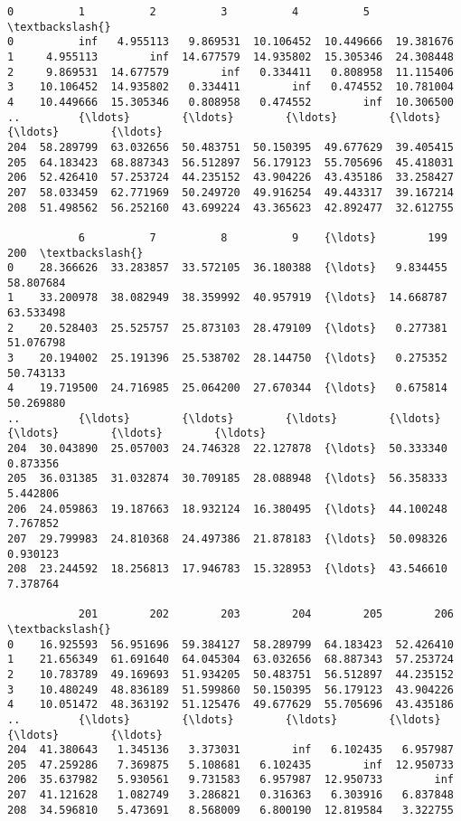 \documentclass[11pt]{article}
\makeatletter
\newcommand{\boxspacing}{\kern\kvtcb@left@rule\kern\kvtcb@boxsep}
\newcommand{\prompt}[4]{
        {\ttfamily\llap{{\color{#2}[#3]:\hspace{3pt}#4}}\vspace{-\baselineskip}}
    }
\makeatother
\begin{document}
            \begin{tcolorbox}[breakable, size=fbox, boxrule=.5pt, pad at break*=1mm, opacityfill=0]
\prompt{Out}{outcolor}{17}{\boxspacing}
\begin{Verbatim}[commandchars=\\\{\}]
           0          1          2          3          4          5    \textbackslash{}
0          inf   4.955113   9.869531  10.106452  10.449666  19.381676
1     4.955113        inf  14.677579  14.935802  15.305346  24.308448
2     9.869531  14.677579        inf   0.334411   0.808958  11.115406
3    10.106452  14.935802   0.334411        inf   0.474552  10.781004
4    10.449666  15.305346   0.808958   0.474552        inf  10.306500
..         {\ldots}        {\ldots}        {\ldots}        {\ldots}        {\ldots}        {\ldots}
204  58.289799  63.032656  50.483751  50.150395  49.677629  39.405415
205  64.183423  68.887343  56.512897  56.179123  55.705696  45.418031
206  52.426410  57.253724  44.235152  43.904226  43.435186  33.258427
207  58.033459  62.771969  50.249720  49.916254  49.443317  39.167214
208  51.498562  56.252160  43.699224  43.365623  42.892477  32.612755

           6          7          8          9    {\ldots}        199        200  \textbackslash{}
0    28.366626  33.283857  33.572105  36.180388  {\ldots}   9.834455  58.807684
1    33.200978  38.082949  38.359992  40.957919  {\ldots}  14.668787  63.533498
2    20.528403  25.525757  25.873103  28.479109  {\ldots}   0.277381  51.076798
3    20.194002  25.191396  25.538702  28.144750  {\ldots}   0.275352  50.743133
4    19.719500  24.716985  25.064200  27.670344  {\ldots}   0.675814  50.269880
..         {\ldots}        {\ldots}        {\ldots}        {\ldots}  {\ldots}        {\ldots}        {\ldots}
204  30.043890  25.057003  24.746328  22.127878  {\ldots}  50.333340   0.873356
205  36.031385  31.032874  30.709185  28.088948  {\ldots}  56.358333   5.442806
206  24.059863  19.187663  18.932124  16.380495  {\ldots}  44.100248   7.767852
207  29.799983  24.810368  24.497386  21.878183  {\ldots}  50.098326   0.930123
208  23.244592  18.256813  17.946783  15.328953  {\ldots}  43.546610   7.378764

           201        202        203        204        205        206  \textbackslash{}
0    16.925593  56.951696  59.384127  58.289799  64.183423  52.426410
1    21.656349  61.691640  64.045304  63.032656  68.887343  57.253724
2    10.783789  49.169693  51.934205  50.483751  56.512897  44.235152
3    10.480249  48.836189  51.599860  50.150395  56.179123  43.904226
4    10.051472  48.363192  51.125476  49.677629  55.705696  43.435186
..         {\ldots}        {\ldots}        {\ldots}        {\ldots}        {\ldots}        {\ldots}
204  41.380643   1.345136   3.373031        inf   6.102435   6.957987
205  47.259286   7.369875   5.108681   6.102435        inf  12.950733
206  35.637982   5.930561   9.731583   6.957987  12.950733        inf
207  41.121628   1.082749   3.286821   0.316363   6.303916   6.837848
208  34.596810   5.473691   8.568009   6.800190  12.819584   3.322755


\end{Verbatim}
\end{tcolorbox}
\end{document}
